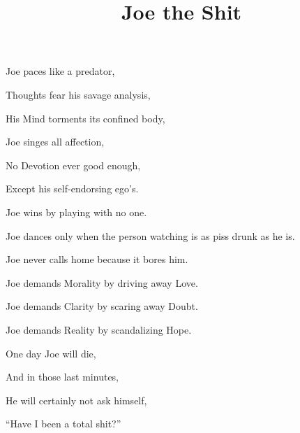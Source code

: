 \documentclass{article}
\title{Joe the Shit}
\begin{document}
 \newline

Joe paces like a predator,

Thoughts fear his savage analysis,

His Mind torments its confined body,

\newline 

Joe singes all affection,

No Devotion ever good enough,

Except his self-endorsing ego's.

\newline

Joe wins by playing with no one.

Joe dances only when the person watching is as piss drunk as he is.

Joe never calls home because it bores him.

\newline

Joe demands Morality by driving away Love.

Joe demands Clarity by scaring away Doubt.

Joe demands Reality by scandalizing Hope.

\newline

One day Joe will die,

And in those last minutes,

He will certainly not ask himself,

``Have I been a total shit?''
\end{document}
